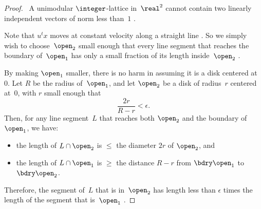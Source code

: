 \begin{proof} 
~A unimodular $\integer$-lattice in~$\real^2$ cannot contain two linearly independent vectors of norm less than~$1$ .

 Note that $u^t x$ moves at constant velocity along a straight line . So we simply wish to choose~$\open_2$ small enough that every line segment that reaches the boundary of~$\open_1$ has only a small fraction of its length inside~$\open_2$ .

By making $\open_1$ smaller, there is no harm in assuming it is a disk centered at~$0$. Let $R$ be the radius of~$\open_1$, and let $\open_2$ be a disk of radius~$r$ centered at~$0$, with $r$ small enough that
	$$ \frac{2r}{R - r} < \epsilon .$$
Then, for any line segment~$L$ that reaches both $\open_2$ and the boundary of~$\open_1$, we have:
	\begin{itemize}
	\item the length of $L \cap \open_2$ is $\le$ the diameter $2r$ of $\open_2$,
	and
	\item the length of $L \cap \open_1$ is $\ge$ the distance $R - r$ from $\bdry \open_1$ to $\bdry \open_2$.
	\end{itemize}
Therefore, the segment of~$L$ that is in~$\open_2$ has length less than $\epsilon$ times the length of the segment that is~$\open_1$  .
\end{proof}

